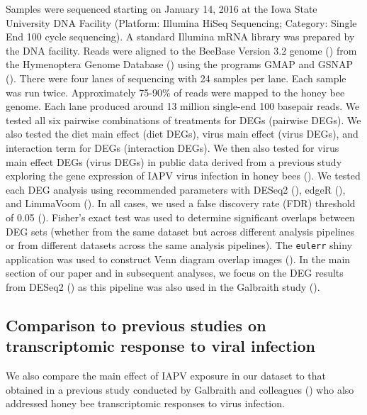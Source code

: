 \documentclass[11pt,a4paper,oldfontcommands,openany]{memoir}
\numberwithin{equation}{section} %
\newcommand{\pkg}[1]{{\texttt{#1}}}
\begin{document}
Samples were sequenced starting on January 14, 2016 at the Iowa State University DNA Facility (Platform: Illumina HiSeq Sequencing; Category: Single End 100 cycle sequencing). A standard Illumina mRNA library was prepared by the DNA facility. Reads were aligned to the BeeBase Version 3.2 genome (\citealt{hbGenome}) from the Hymenoptera Genome Database (\citealt{hymenopteraDB}) using the programs GMAP and GSNAP (\citealt{gsnap}). There were four lanes of sequencing with 24 samples per lane. Each sample was run twice. Approximately 75-90\% of reads were mapped to the honey bee genome. Each lane produced around 13 million single-end 100 basepair reads. We tested all six pairwise combinations of treatments for DEGs (pairwise DEGs). We also tested the diet main effect (diet DEGs), virus main effect (virus DEGs), and interaction term for DEGs (interaction DEGs). We then also tested for virus main effect DEGs (virus DEGs) in public data derived from a previous study exploring the gene expression of IAPV virus infection in honey bees (\citealt{galbraith}). We tested each DEG analysis using recommended parameters with DESeq2 (\citealt{deseq2}), edgeR (\citealt{edger}), and LimmaVoom (\citealt{limma}). In all cases, we used a false discovery rate (FDR) threshold of 0.05 (\citealt{benjamini}). Fisher's exact test was used to determine significant overlaps between DEG sets (whether from the same dataset but across different analysis pipelines or from different datasets across the same analysis pipelines). The \pkg{eulerr} shiny application was used to construct Venn diagram overlap images (\citealt{euler}). In the main section of our paper and in subsequent analyses, we focus on the DEG results from DESeq2 (\citealt{deseq2}) as this pipeline was also used in the Galbraith study (\citealt{galbraith}).




\subsection{Comparison to previous studies on transcriptomic response to viral infection}

We also compare the main effect of IAPV exposure in our dataset to that obtained in a previous study conducted by Galbraith and colleagues (\citealt{galbraith}) who also addressed honey bee transcriptomic responses to virus infection.
\end{document}
